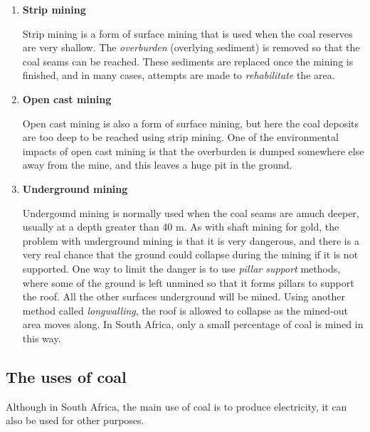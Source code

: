 \begin{enumerate}
\item{\textbf{Strip mining}

Strip mining is a form of surface mining that is used when the coal reserves are very shallow. The \textit{overburden} (overlying sediment) is removed so that the coal seams can be reached. These sediments are replaced once the mining is finished, and in many cases, attempts are made to \textit{rehabilitate} the area. 
}

\item{\textbf{Open cast mining}

Open cast mining is also a form of surface mining, but here the coal deposits are too deep to be reached using strip mining. One of the environmental impacts of open cast mining is that the overburden is dumped somewhere else away from the mine, and this leaves a huge pit in the ground.
}

\item{\textbf{Underground mining}

Undergound mining is normally used when the coal seams are amuch deeper, usually at a depth greater than 40 m. As with shaft mining for gold, the problem with underground mining is that it is very dangerous, and there is a very real chance that the ground could collapse during the mining if it is not supported. One way to limit the danger is to use \textit{pillar support} methods, where some of the ground is left unmined so that it forms pillars to support the roof. All the other surfaces underground will be mined. Using another method called \textit{longwalling}, the roof is allowed to collapse as the mined-out area moves along. In South Africa, only a small percentage of coal is mined in this way. 
}
\end{enumerate}

\subsection{The uses of coal}

Although in South Africa, the main use of coal is to produce electricity, it can also be used for other purposes.

